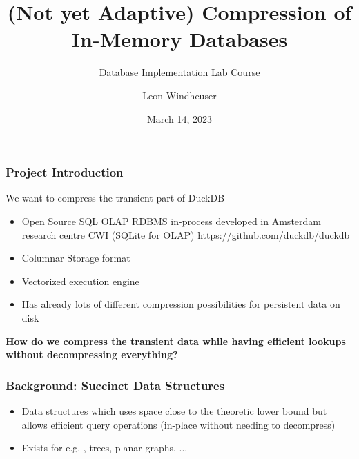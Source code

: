 \documentclass{beamer}
\title{(Not yet Adaptive) Compression of In-Memory Databases}
\subtitle{Database Implementation Lab Course}
\author{Leon Windheuser}
\date{March 14, 2023}
\begin{document}
\frame{\titlepage}


\begin{frame}
    \frametitle{Project Introduction}
    We want to compress the transient part of DuckDB
    \pause

    \begin{itemize}
        \item Open Source SQL OLAP RDBMS in-process developed in Amsterdam research centre CWI (SQLite for OLAP)
        \url{https://github.com/duckdb/duckdb}
        \item Columnar Storage format
        \item Vectorized execution engine
        \item Has already lots of different compression possibilities for persistent data on disk 
    \end{itemize}

    \vspace{1cm}
    \pause
    \centering
    \textbf{How do we compress the transient data while having efficient lookups without decompressing everything?}
\end{frame}


\begin{frame}
    \frametitle{Background: Succinct Data Structures}
    
    \begin{itemize}
        \item Data structures which uses space close to the theoretic
            lower bound but allows efficient query operations (in-place without needing to decompress)
        \item Exists for e.g. {}, trees, planar graphs, ...
    \end{itemize}
\end{frame}
\end{document}
